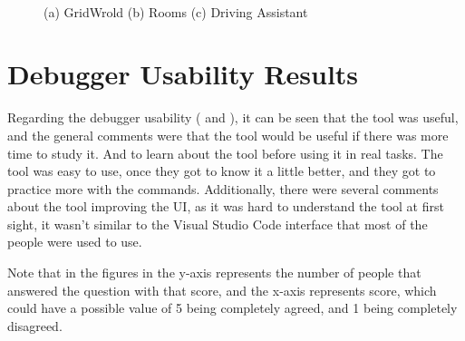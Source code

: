 \begin{figure}
    \centering
     \\
    \caption{(a) GridWrold (b) Rooms (c) Driving Assistant}
    \label{fig:general-know}
\end{figure}

\section{Debugger Usability Results}
\label{sec:usability}

Regarding the debugger usability ( and ), it can 
be seen that the tool was useful,
and the general comments were that the tool would be useful if there was more time to study it. 
And to learn about the tool before using it in real tasks. The 
tool was easy to use, once they got to know it a little better, and they got to practice more with the commands.
Additionally, there were several comments about the tool improving the UI,
as it was hard to understand the tool at first sight, it wasn't similar to the Visual Studio Code 
interface that most of the people were used to use.

Note that in the figures in  the y-axis represents the number of people 
that answered the question with that score, and the x-axis represents score, which could have a 
possible value of 5 being completely agreed, and 1 being completely disagreed.

